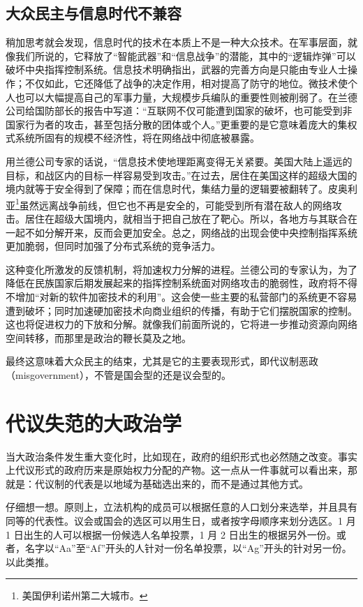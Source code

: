 \subsection{大众民主与信息时代不兼容}
稍加思考就会发现，信息时代的技术在本质上不是一种大众技术。在军事层面，就像我们所说的，它释放了“智能武器”和“信息战争”的潜能，其中的“逻辑炸弹”可以破坏中央指挥控制系统。信息技术明确指出，武器的完善方向是只能由专业人士操作；不仅如此，它还降低了战争的决定作用，相对提高了防守的地位。微技术使个人也可以大幅提高自己的军事力量，大规模步兵编队的重要性则被削弱了。在兰德公司给国防部长的报告中写道：“互联网不仅可能遭到国家的破坏，也可能受到非国家行为者的攻击，甚至包括分散的团体或个人。”更重要的是它意味着庞大的集权式系统所固有的规模不经济性，将在网络战中彻底被暴露。

用兰德公司专家的话说，“信息技术使地理距离变得无关紧要。美国大陆上遥远的目标，和战区内的目标一样容易受到攻击。”在过去，居住在美国这样的超级大国的境内就等于安全得到了保障；而在信息时代，集结力量的逻辑要被翻转了。皮奥利亚\footnote{美国伊利诺州第二大城市。}虽然远离战争前线，但它也不再是安全的，可能受到所有潜在敌人的网络攻击。居住在超级大国境内，就相当于把自己放在了靶心。所以，各地方与其联合在一起不如分解开来，反而会更加安全。总之，网络战的出现会使中央控制指挥系统更加脆弱，但同时加强了分布式系统的竞争活力。

这种变化所激发的反馈机制，将加速权力分解的进程。兰德公司的专家认为，为了降低在民族国家后期发展起来的指挥控制系统面对网络攻击的脆弱性，政府将不得不增加“对新的软件加密技术的利用”。这会使一些主要的私营部门的系统更不容易遭到破坏；同时加速硬加密技术向商业组织的传播，有助于它们摆脱国家的控制。这也将促进权力的下放和分解。就像我们前面所说的，它将进一步推动资源向网络空间转移，而那里是政治的鞭长莫及之地。

最终这意味着大众民主的结束，尤其是它的主要表现形式，即代议制恶政（misgovernment），不管是国会型的还是议会型的。

\section{代议失范的大政治学}
当大政治条件发生重大变化时，比如现在，政府的组织形式也必然随之改变。事实上代议形式的政府历来是原始权力分配的产物。这一点从一件事就可以看出来，那就是：代议制的代表是以地域为基础选出来的，而不是通过其他方式。

仔细想一想。原则上，立法机构的成员可以根据任意的人口划分来选举，并且具有同等的代表性。议会或国会的选区可以用生日，或者按字母顺序来划分选区。1 月 1 日出生的人可以根据一份候选人名单投票，1 月 2 日出生的根据另外一份。或者，名字以“Aa”至“Af”开头的人针对一份名单投票，以“Ag”开头的针对另一份。以此类推。

